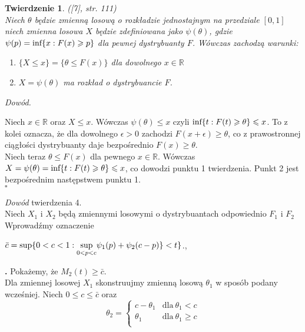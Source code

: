 \documentclass[12pt,a4paper,openany]{book}
\newtheorem{tw}{Twierdzenie}
\newcommand*{\QEDB}{\hfill\ensuremath{\square}}
\newcommand{\RomanNumeralCaps}[1]
    {\MakeUppercase{\romannumeral #1}}
\begin{document}
\begin{tw}\textnormal{([7], str. 111)}\*\\
Niech $\theta$ będzie zmienną losową o rozkładzie jednostajnym na przedziale $[0,1]$  niech zmienna losowa $X$ będzie zdefiniowana jako $\psi(\theta)$, gdzie  $\psi(p) =     \textnormal{inf} \{x: F(x)\geqslant p \}$ dla pewnej dystrybuanty $F$. Wówczas zachodzą warunki:
\begin{enumerate}

\item 

$\lbrace X \leqslant x \rbrace = \lbrace \theta \leqslant F(x) \rbrace$ dla dowolnego $x \in \mathbb{R}$

\item 

$X = \psi(\theta)$ ma rozkład o dystrybuancie $F$.

\end{enumerate}

\end{tw}

\noindent \textit{Dowód.}

\noindent Niech $x \in \mathbb{R}$ oraz $X \leqslant x$. Wówczas $\psi(\theta) \leqslant x$ czyli $\textnormal{inf} \{t: F(t)\geqslant \theta \} \leqslant x$. To z kolei oznacza, że dla dowolnego $\epsilon > 0$ zachodzi $F(x+\epsilon) \geqslant \theta$, co z prawostronnej ciągłości dystrybuanty daje bezpośrednio $F(x) \geqslant \theta$.\\
\noindent Niech teraz $\theta \leqslant F(x)$ dla pewnego $x \in \mathbb{R}$. Wówczas $X = \psi(\theta) = \textnormal{inf} \{t: F(t)\geqslant \theta \} \leqslant x$, co dowodzi punktu 1 twierdzenia. Punkt 2 jest bezpośrednim następstwem punktu 1.\\
 \phantom{1} \hfill \QEDB

\noindent \textit{Dowód} twierdzenia 4.\\
Niech $X_{1}$ i $X_{2}$ będą zmiennymi losowymi o dystrybuantach odpowiednio $F_{1}$ i $F_{2}$ 
Wprowadźmy oznaczenie
\begin{center}
$\bar c =  \textnormal{sup}\{0<c<1: \underset{0<p<c}{\textnormal{sup}}\psi_{1}(p) + \psi_{2}(c-p)\} <t\}$.,\\
\end{center}

\noindent \textbf{\RomanNumeralCaps{1}.} Pokażemy, że $M_{2}(t) \geqslant \bar c$.\\
Dla zmiennej losowej $X_{1}$ skonstruujmy zmienną losową $\theta_{1}$ w sposób podany wcześniej. Niech $0 \leqslant c \leqslant \bar c$ oraz
\[
  \theta_{2} =
  \begin{cases}
                                   c - \theta_{1} & \text{dla} \ \theta_{1} < c \\
                                   \theta_{1} & \text{dla} \ \theta_{1}  \geqslant c \\
  \end{cases}
\]
\end{document}

